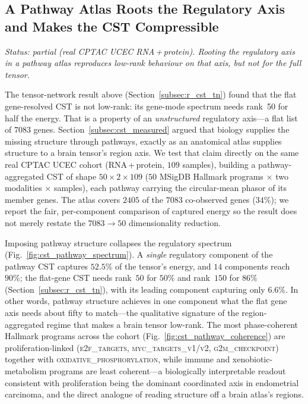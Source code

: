 \documentclass[preprint,12pt,amsmath,amssymb,superscriptaddress,floatfix]{revtex4-2}
\begin{document}
\subsection{A Pathway Atlas Roots the Regulatory Axis and Makes the CST Compressible}
\label{subsec:r_cst_pathway}

\emph{Status: partial (real CPTAC UCEC RNA\,+\,protein). Rooting the regulatory
axis in a pathway atlas reproduces low-rank behaviour on that axis, but not for
the full tensor.}

The tensor-network result above (Section~\ref{subsec:r_cst_tn}) found that the
flat gene-resolved CST is not low-rank: its gene-mode spectrum needs rank~50
for half the energy. That is a property of an \emph{unstructured} regulatory
axis---a flat list of $7083$ genes. Section~\ref{subsec:cst_measured} argued
that biology supplies the missing structure through pathways, exactly as an
anatomical atlas supplies structure to a brain tensor's region axis. We test
that claim directly on the same real CPTAC UCEC cohort (RNA\,+\,protein,
$109$ samples), building a pathway-aggregated CST of shape
$50\times2\times109$ ($50$ MSigDB Hallmark programs $\times$ two modalities
$\times$ samples), each pathway carrying the circular-mean phasor of its
member genes. The atlas covers $2405$ of the $7083$ co-observed genes
($34\%$); we report the fair, per-component comparison of captured energy so
the result does not merely restate the $7083\!\rightarrow\!50$ dimensionality
reduction.

Imposing pathway structure collapses the regulatory spectrum
(Fig.~\ref{fig:cst_pathway_spectrum}). A \emph{single} regulatory component of
the pathway CST captures $52.5\%$ of the tensor's energy, and $14$ components
reach $90\%$; the flat-gene CST needs rank~$50$ for $50\%$ and rank~$150$ for
$86\%$ (Section~\ref{subsec:r_cst_tn}), with its leading component capturing
only $6.6\%$. In other words, pathway structure achieves in one component what
the flat gene axis needs about fifty to match---the qualitative signature of
the region-aggregated regime that makes a brain tensor low-rank. The most
phase-coherent Hallmark programs across the cohort
(Fig.~\ref{fig:cst_pathway_coherence}) are proliferation-linked
(\textsc{e2f\_targets}, \textsc{myc\_targets\_v1/v2}, \textsc{g2m\_checkpoint})
together with \textsc{oxidative\_phosphorylation}, while immune and
xenobiotic-metabolism programs are least coherent---a biologically
interpretable readout consistent with proliferation being the dominant
coordinated axis in endometrial carcinoma, and the direct analogue of reading
structure off a brain atlas's regions.
\end{document}
